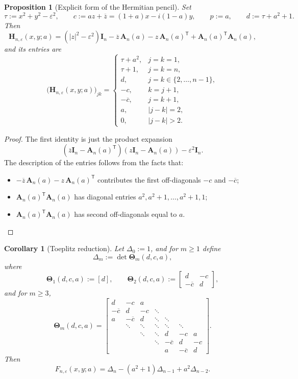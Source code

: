\documentclass[11pt]{article}
\newtheorem{proposition}[theorem]{Proposition}
\newtheorem{corollary}[theorem]{Corollary}
\begin{document}
\begin{proposition}[Explicit form of the Hermitian pencil]\label{prop:explicit-H}
Set
\[
\tau:=x^2+y^2-\varepsilon^2,
\qquad
c:=az+\overline z=(1+a)x-i(1-a)y,
\qquad
p:=a,
\qquad
d:=\tau+a^2+1.
\]
Then
\[
\mathbf H_{n,\varepsilon}(x,y;a)
=
(|z|^2-\varepsilon^2)\mathbf I_n-\overline z\,\mathbf A_n(a)-z\,\mathbf A_n(a)^{\mathsf T}
+\mathbf A_n(a)^{\mathsf T}\mathbf A_n(a),
\]
and its entries are
\[
\bigl(\mathbf H_{n,\varepsilon}(x,y;a)\bigr)_{jk}
=
\begin{cases}
\tau+a^2, & j=k=1,\\[1mm]
\tau+1, & j=k=n,\\[1mm]
d, & j=k\in\{2,\dots,n-1\},\\[1mm]
-c, & k=j+1,\\[1mm]
-\overline c, & j=k+1,\\[1mm]
a, & |j-k|=2,\\[1mm]
0, & |j-k|>2.
\end{cases}
\]
\end{proposition}

\begin{proof}
The first identity is just the product expansion
\[
(\overline z\mathbf I_n-\mathbf A_n(a)^{\mathsf T})(z\mathbf I_n-\mathbf A_n(a))-\varepsilon^2\mathbf I_n.
\]
The description of the entries follows from the facts that:
\begin{itemize}
\item \(-\overline z\,\mathbf A_n(a)-z\,\mathbf A_n(a)^{\mathsf T}\) contributes the first off-diagonals \(-c\) and \(-\overline c\);
\item \(\mathbf A_n(a)^{\mathsf T}\mathbf A_n(a)\) has diagonal entries \(a^2,a^2+1,\dots,a^2+1,1\);
\item \(\mathbf A_n(a)^{\mathsf T}\mathbf A_n(a)\) has second off-diagonals equal to \(a\).
\end{itemize}
\end{proof}

\begin{corollary}[Toeplitz reduction]\label{cor:Toeplitz-reduction}
Let \(\Delta_0:=1\), and for \(m\ge 1\) define
\[
\Delta_m:=\det \mathbf\Theta_m(d,c,a),
\]
where
\[
\mathbf\Theta_1(d,c,a):=[d],
\qquad
\mathbf\Theta_2(d,c,a):=
\begin{bmatrix}
d & -c\\
-\overline c & d
\end{bmatrix},
\]
and for \(m\ge 3\),
\[
\mathbf\Theta_m(d,c,a)=
\begin{bmatrix}
d & -c & a \\
-\overline c & d & -c & \ddots \\
a & -\overline c & d & \ddots & \ddots \\
& \ddots & \ddots & \ddots & \ddots & \ddots \\
&& \ddots & \ddots & d & -c & a \\
&&& \ddots & -\overline c & d & -c \\
&&&& a & -\overline c & d
\end{bmatrix}.
\]
Then
\[
F_{n,\varepsilon}(x,y;a)
=
\Delta_n-(a^2+1)\Delta_{n-1}+a^2\Delta_{n-2}.
\]
\end{corollary}
\end{document}
